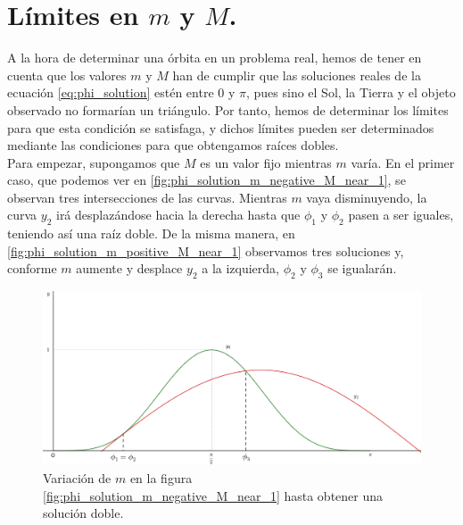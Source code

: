\section{Límites en $m$ y $M$.}
\label{sec:limites_m_M}
A la hora de determinar una órbita en un problema real, hemos de tener en cuenta que los valores $m$ y $M$ han de cumplir que las soluciones reales de la ecuación \eqref{eq:phi_solution} estén entre $0$ y $\pi$, pues sino el Sol, la Tierra y el objeto observado no formarían un triángulo. Por tanto, hemos de determinar los límites para que esta condición se satisfaga, y dichos límites pueden ser determinados mediante las condiciones para que obtengamos raíces dobles.\\

Para empezar, supongamos que $M$ es un valor fijo mientras $m$ varía. En el primer caso, que podemos ver en \ref{fig:phi_solution_m_negative_M_near_1}, se observan tres intersecciones de las curvas. Mientras $m$ vaya disminuyendo, la curva $y_2$ irá desplazándose hacia la derecha hasta que $\phi_1$ y $\phi_2$ pasen a ser iguales, teniendo así una raíz doble. De la misma manera, en \ref{fig:phi_solution_m_positive_M_near_1} observamos tres soluciones y, conforme $m$ aumente y desplace $y_2$ a la izquierda, $\phi_2$ y $\phi_3$ se igualarán.\\

\begin{figure}[H]
\centering
\includegraphics[scale=0.115]{images/minuscula_varia_primer_caso.png}
\caption{Variación de $m$ en la figura \ref{fig:phi_solution_m_negative_M_near_1} hasta obtener una solución doble.}
\label{fig:minuscula_varia_primer_caso}
\end{figure}

